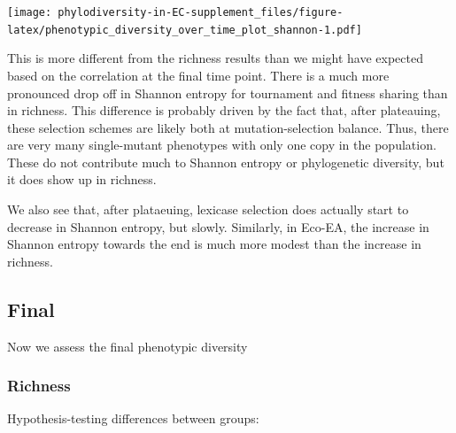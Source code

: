 \documentclass[]{book}
\begin{document}
\texttt{[image: phylodiversity-in-EC-supplement\_files/figure-latex/phenotypic\_diversity\_over\_time\_plot\_shannon-1.pdf]}

This is more different from the richness results than we might have expected based on the correlation at the final time point. There is a much more pronounced drop off in Shannon entropy for tournament and fitness sharing than in richness. This difference is probably driven by the fact that, after plateauing, these selection schemes are likely both at mutation-selection balance. Thus, there are very many single-mutant phenotypes with only one copy in the population. These do not contribute much to Shannon entropy or phylogenetic diversity, but it does show up in richness.

We also see that, after plataeuing, lexicase selection does actually start to decrease in Shannon entropy, but slowly. Similarly, in Eco-EA, the increase in Shannon entropy towards the end is much more modest than the increase in richness.

\hypertarget{final-2}{%
\subsection{Final}\label{final-2}}

Now we assess the final phenotypic diversity

\hypertarget{richness-1}{%
\subsubsection{Richness}\label{richness-1}}

Hypothesis-testing differences between groups:
\end{document}
